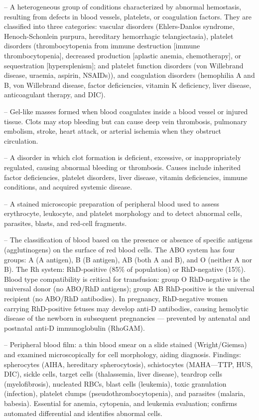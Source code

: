 -- A heterogeneous group of conditions characterized by abnormal hemostasis, resulting from defects in blood vessels, platelets, or coagulation factors. They are classified into three categories: vascular disorders (Ehlers-Danlos syndrome, Henoch-Schonlein purpura, hereditary hemorrhagic telangiectasia), platelet disorders (thrombocytopenia from immune destruction [immune thrombocytopenia], decreased production [aplastic anemia, chemotherapy], or sequestration [hypersplenism]; and platelet function disorders (von Willebrand disease, uraemia, aspirin, NSAIDs)), and coagulation disorders (hemophilia A and B, von Willebrand disease, factor deficiencies, vitamin K deficiency, liver disease, anticoagulant therapy, and DIC).

-- Gel-like masses formed when blood coagulates inside a blood vessel or injured tissue. Clots may stop bleeding but can cause deep vein thrombosis, pulmonary embolism, stroke, heart attack, or arterial ischemia when they obstruct circulation.

-- A disorder in which clot formation is deficient, excessive, or inappropriately regulated, causing abnormal bleeding or thrombosis. Causes include inherited factor deficiencies, platelet disorders, liver disease, vitamin deficiencies, immune conditions, and acquired systemic disease.

-- A stained microscopic preparation of peripheral blood used to assess erythrocyte, leukocyte, and platelet morphology and to detect abnormal cells, parasites, blasts, and red-cell fragments.

-- The classification of blood based on the presence or absence of specific antigens (agglutinogens) on the surface of red blood cells. The ABO system has four groups: A (A antigen), B (B antigen), AB (both A and B), and O (neither A nor B). The Rh system: RhD-positive (85\% of population) or RhD-negative (15\%). Blood type compatibility is critical for transfusion: group O RhD-negative is the universal donor (no ABO/RhD antigens); group AB RhD-positive is the universal recipient (no ABO/RhD antibodies). In pregnancy, RhD-negative women carrying RhD-positive fetuses may develop anti-D antibodies, causing hemolytic disease of the newborn in subsequent pregnancies — prevented by antenatal and postnatal anti-D immunoglobulin (RhoGAM).

-- Peripheral blood film: a thin blood smear on a slide stained (Wright/Giemsa) and examined microscopically for cell morphology, aiding diagnosis. Findings: spherocytes (AIHA, hereditary spherocytosis), schistocytes (MAHA—TTP, HUS, DIC), sickle cells, target cells (thalassemia, liver disease), teardrop cells (myelofibrosis), nucleated RBCs, blast cells (leukemia), toxic granulation (infection), platelet clumps (pseudothrombocytopenia), and parasites (malaria, babesia). Essential for anemia, cytopenia, and leukemia evaluation; confirms automated differential and identifies abnormal cells.


